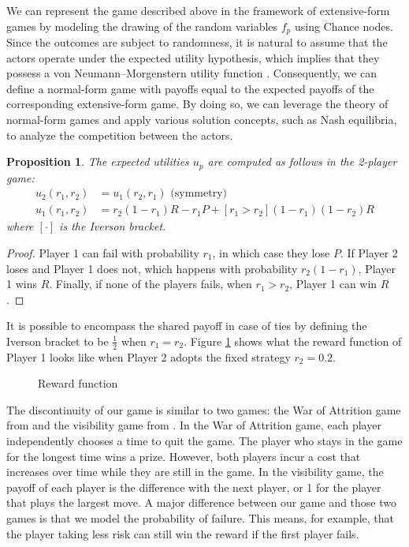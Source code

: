 \documentclass[preprint,12pt,authoryear]{elsarticle}
\newtheorem{proposition}[theorem]{Proposition}
\theoremstyle{definition}
\begin{document}
We can represent the game described above in the framework of extensive-form games \citep{hart1992games} by modeling the drawing of the random variables $f_p$ using Chance nodes. Since the outcomes are subject to randomness, it is natural to assume that the actors operate under the expected utility hypothesis, which implies that they possess a von Neumann–Morgenstern utility function \citep{neumann1944theory}. Consequently, we can define a normal-form game with payoffs equal to the expected payoffs of the corresponding extensive-form game. By doing so, we can leverage the theory of normal-form games and apply various solution concepts, such as Nash equilibria, to analyze the competition between the actors.
\begin{proposition}
The expected utilities $u_p$ are computed as follows in the 2-player game:
\begin{align*}
    u_2(r_1, r_2) &= u_1(r_2, r_1) \text{~(symmetry)}\\
    u_1(r_1, r_2) &= r_2 (1-r_1) R - r_1 P + [ r_1 > r_2 ] (1-r_1)(1-r_2) R
\end{align*}
where $[ \cdot ]$ is the Iverson bracket.
\end{proposition}
\begin{proof}
Player 1 can fail with probability $r_1$, in which case they lose $P$. If Player 2 loses and Player 1 does not, which happens with probability $r_2(1-r_1)$, Player 1 wins $R$. Finally, if none of the players fails, when $r_1 > r_2$, Player 1 can win $R$.
\end{proof}

It is possible to encompass the shared payoff in case of ties by defining the Iverson bracket to be $\frac{1}{2}$ when $r_1 = r_2$.
Figure \ref{fig:reward} shows what the reward function of Player 1 looks like when Player 2 adopts the fixed strategy $r_2=0.2$.

\begin{figure}[htbp]
    \centering
    
    \caption{Reward function}
    \label{fig:reward}
\end{figure}


The discontinuity of our game is similar to two games: the War of Attrition game from \cite{smith1974theory} and the visibility game from \cite{Lotker2008-tx}. In the War of Attrition game, each player independently chooses a time to quit the game. The player who stays in the game for the longest time wins a prize. However, both players incur a cost that increases over time while they are still in the game. In the visibility game, the payoff of each player is the difference with the next player, or 1 for the player that plays the largest move. A major difference between our game and those two games is that we model the probability of failure. This means, for example, that the player taking less risk can still win the reward if the first player fails.
\end{document}
